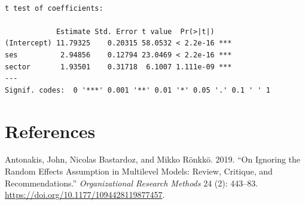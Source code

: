 \documentclass[
  letterpaper,
  DIV=11,
  numbers=noendperiod]{scrreprt}
\newlength{\cslhangindent}
\newenvironment{CSLReferences}[2] %
 {\begin{list}{}{%
  \setlength{\itemindent}{0pt}
  \setlength{\leftmargin}{0pt}
  \setlength{\parsep}{0pt}
  \ifodd #1
   \setlength{\leftmargin}{\cslhangindent}
   \setlength{\itemindent}{-1\cslhangindent}
  \fi
  \setlength{\itemsep}{#2\baselineskip}}}
 {\end{list}}
\begin{document}
\begin{verbatim}

t test of coefficients:

            Estimate Std. Error t value  Pr(>|t|)    
(Intercept) 11.79325    0.20315 58.0532 < 2.2e-16 ***
ses          2.94856    0.12794 23.0469 < 2.2e-16 ***
sector       1.93501    0.31718  6.1007 1.111e-09 ***
---
Signif. codes:  0 '***' 0.001 '**' 0.01 '*' 0.05 '.' 0.1 ' ' 1
\end{verbatim}


\chapter*{References}\label{references}


\label{refs}
\begin{CSLReferences}{1}{0}
Antonakis, John, Nicolas Bastardoz, and Mikko Rönkkö. 2019. {``On
Ignoring the Random Effects Assumption in Multilevel Models: Review,
Critique, and Recommendations.''} \emph{Organizational Research Methods}
24 (2): 443--83. \url{https://doi.org/10.1177/1094428119877457}.

\end{CSLReferences}
\end{document}
